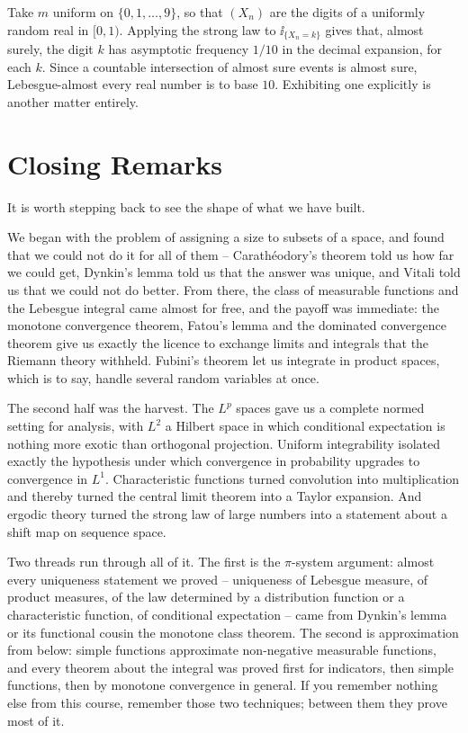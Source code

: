 \documentclass[a4paper]{scrartcl}
\newcommand{\ind}{\ii}
\begin{document}
\begin{example}
	Take $m$ uniform on $\{0,1,\dots,9\}$, so that $(X_n)$ are the digits of a uniformly random real in $[0,1)$. Applying the strong law to $\ind_{\{X_n = k\}}$ gives that, almost surely, the digit $k$ has asymptotic frequency $1/10$ in the decimal expansion, for each $k$. Since a countable intersection of almost sure events is almost sure, Lebesgue-almost every real number is  to base $10$. Exhibiting one explicitly is another matter entirely.
\end{example}

\section{Closing Remarks}

It is worth stepping back to see the shape of what we have built.

We began with the problem of assigning a size to subsets of a space, and found that we could not do it for all of them -- Carath\'eodory's theorem told us how far we could get, Dynkin's lemma told us that the answer was unique, and Vitali told us that we could not do better. From there, the class of measurable functions and the Lebesgue integral came almost for free, and the payoff was immediate: the monotone convergence theorem, Fatou's lemma and the dominated convergence theorem give us exactly the licence to exchange limits and integrals that the Riemann theory withheld. Fubini's theorem let us integrate in product spaces, which is to say, handle several random variables at once.

The second half was the harvest. The $L^p$ spaces gave us a complete normed setting for analysis, with $L^2$ a Hilbert space in which conditional expectation is nothing more exotic than orthogonal projection. Uniform integrability isolated exactly the hypothesis under which convergence in probability upgrades to convergence in $L^1$. Characteristic functions turned convolution into multiplication and thereby turned the central limit theorem into a Taylor expansion. And ergodic theory turned the strong law of large numbers into a statement about a shift map on sequence space.

Two threads run through all of it. The first is the $\pi$-system argument: almost every uniqueness statement we proved -- uniqueness of Lebesgue measure, of product measures, of the law determined by a distribution function or a characteristic function, of conditional expectation -- came from Dynkin's lemma or its functional cousin the monotone class theorem. The second is approximation from below: simple functions approximate non-negative measurable functions, and every theorem about the integral was proved first for indicators, then simple functions, then by monotone convergence in general. If you remember nothing else from this course, remember those two techniques; between them they prove most of it.
\end{document}

